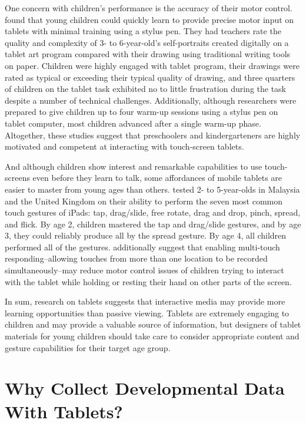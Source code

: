 \documentclass[man,noapacite]{apa2}
\begin{document}
One concern with children's performance is the accuracy of their motor control.  found that young children could quickly learn to provide precise motor input on tablets with minimal training using a stylus pen. They had teachers rate the quality and complexity of 3- to 6-year-old's self-portraits created digitally on a tablet art program compared with their drawing using traditional writing tools on paper. Children were highly engaged with tablet program, their drawings were rated as typical or exceeding their typical quality of drawing, and three quarters of children on the tablet task exhibited no to little frustration during the task despite a number of technical challenges. Additionally, although researchers were prepared to give children up to four warm-up sessions using a stylus pen on tablet computer, most children advanced after a single warm-up phase. Altogether, these studies suggest that preschoolers and kindergarteners are highly motivated and competent at interacting with touch-screen tablets. 

And although children show interest and remarkable capabilities to use touch-screens even before they learn to talk, some affordances of mobile tablets are easier to master from young ages than others.  tested 2- to 5-year-olds in Malaysia and the United Kingdom on their ability to perform the seven most common touch gestures of iPads: tap, drag/slide, free rotate, drag and drop, pinch, spread, and flick. By age 2, children mastered the tap and drag/slide gestures, and by age 3, they could reliably produce all by the spread gesture. By age 4, all children performed all of the gestures.  additionally suggest that enabling multi-touch responding--allowing touches from more than one location to be recorded simultaneously--may reduce motor control issues of children trying to interact with the tablet while holding or resting their hand on other parts of the screen. 

In sum, research on tablets suggests that interactive media may provide more learning opportunities than passive viewing. Tablets are extremely engaging to children and may provide a valuable source of information, but designers of tablet materials for young children should take care to consider appropriate content and gesture capabilities for their target age group.


\section{Why Collect Developmental Data With Tablets?}
\end{document}
